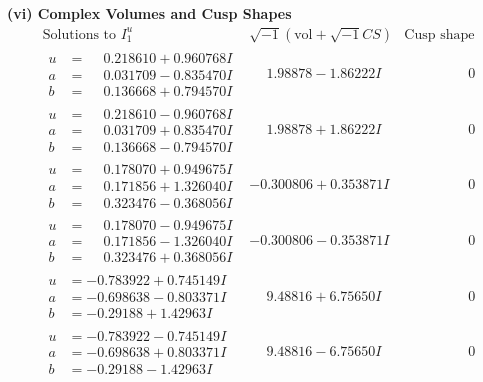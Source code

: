 \documentclass[1p]{elsarticle_modified}
\theoremstyle{definition}
\newcommand{\I}{\sqrt{-1}}
\begin{document}
\newpage\flushleft \textbf{(vi) Complex Volumes and Cusp Shapes}
$$\begin{array}{c|c|c}  
\text{Solutions to }I^u_{1}& \I (\text{vol} + \sqrt{-1}CS) & \text{Cusp shape}\\
 \hline 
\begin{aligned}
u &= \phantom{-}0.218610 + 0.960768 I \\
a &= \phantom{-}0.031709 - 0.835470 I \\
b &= \phantom{-}0.136668 + 0.794570 I\end{aligned}
 & \phantom{-}1.98878 - 1.86222 I & \phantom{-0.000000 } 0 \\ \hline\begin{aligned}
u &= \phantom{-}0.218610 - 0.960768 I \\
a &= \phantom{-}0.031709 + 0.835470 I \\
b &= \phantom{-}0.136668 - 0.794570 I\end{aligned}
 & \phantom{-}1.98878 + 1.86222 I & \phantom{-0.000000 } 0 \\ \hline\begin{aligned}
u &= \phantom{-}0.178070 + 0.949675 I \\
a &= \phantom{-}0.171856 + 1.326040 I \\
b &= \phantom{-}0.323476 - 0.368056 I\end{aligned}
 & -0.300806 + 0.353871 I & \phantom{-0.000000 } 0 \\ \hline\begin{aligned}
u &= \phantom{-}0.178070 - 0.949675 I \\
a &= \phantom{-}0.171856 - 1.326040 I \\
b &= \phantom{-}0.323476 + 0.368056 I\end{aligned}
 & -0.300806 - 0.353871 I & \phantom{-0.000000 } 0 \\ \hline\begin{aligned}
u &= -0.783922 + 0.745149 I \\
a &= -0.698638 - 0.803371 I \\
b &= -0.29188 + 1.42963 I\end{aligned}
 & \phantom{-}9.48816 + 6.75650 I & \phantom{-0.000000 } 0 \\ \hline\begin{aligned}
u &= -0.783922 - 0.745149 I \\
a &= -0.698638 + 0.803371 I \\
b &= -0.29188 - 1.42963 I\end{aligned}
 & \phantom{-}9.48816 - 6.75650 I & \phantom{-0.000000 } 0 \\ \hline\begin{aligned}

\end{aligned}
\end{array}$$
\end{document}
